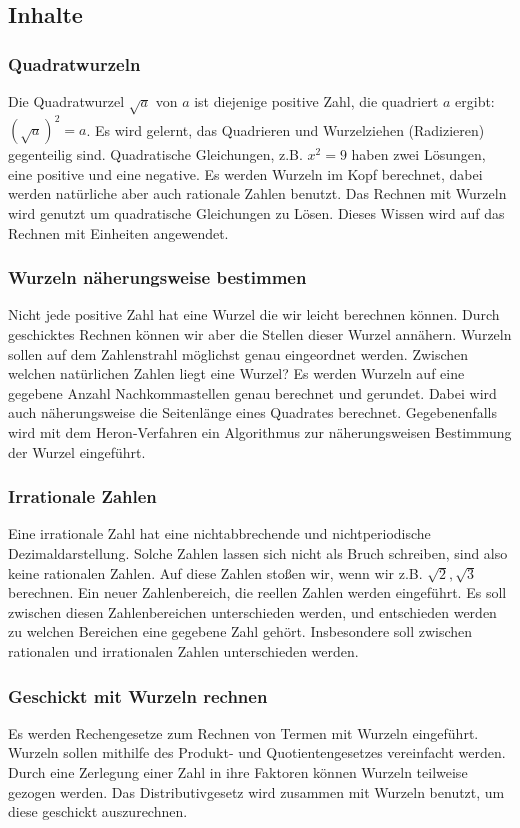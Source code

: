 \documentclass{article}
\begin{document}
\subsection{Inhalte}
\subsubsection*{Quadratwurzeln}
Die Quadratwurzel $\sqrt{a}$ von $a$ ist diejenige positive Zahl, die quadriert $a$ ergibt: $(\sqrt{a})^2 = a$.
Es wird gelernt, das Quadrieren und Wurzelziehen (Radizieren) gegenteilig sind.
Quadratische Gleichungen, z.B. $x^2 = 9$ haben zwei Lösungen, eine positive und eine negative.
Es werden Wurzeln im Kopf berechnet, dabei werden natürliche aber auch rationale Zahlen benutzt.
Das Rechnen mit Wurzeln wird genutzt um quadratische Gleichungen zu Lösen.
Dieses Wissen wird auf das Rechnen mit Einheiten angewendet.
\subsubsection*{Wurzeln näherungsweise bestimmen}
Nicht jede positive Zahl hat eine Wurzel die wir leicht berechnen können. Durch geschicktes Rechnen können wir aber die Stellen dieser Wurzel annähern.
Wurzeln sollen auf dem Zahlenstrahl möglichst genau eingeordnet werden. Zwischen welchen natürlichen Zahlen liegt eine Wurzel?
Es werden Wurzeln auf eine gegebene Anzahl Nachkommastellen genau berechnet und  gerundet.
Dabei wird auch näherungsweise die Seitenlänge eines Quadrates berechnet.
Gegebenenfalls wird mit dem Heron-Verfahren ein Algorithmus zur näherungsweisen Bestimmung der Wurzel eingeführt.
\subsubsection*{Irrationale Zahlen}
Eine irrationale Zahl hat eine nichtabbrechende und nichtperiodische Dezimaldarstellung. Solche Zahlen lassen sich nicht als Bruch schreiben, sind also keine rationalen Zahlen.
Auf diese Zahlen stoßen wir, wenn wir z.B. $\sqrt{2}, \sqrt{3}$ berechnen.
Ein neuer Zahlenbereich, die reellen Zahlen werden eingeführt. Es soll zwischen diesen Zahlenbereichen unterschieden werden, und entschieden werden zu welchen Bereichen eine gegebene Zahl gehört.
Insbesondere soll zwischen rationalen und irrationalen Zahlen unterschieden werden.
\subsubsection*{Geschickt mit Wurzeln rechnen}
Es werden Rechengesetze zum Rechnen von Termen mit Wurzeln eingeführt. 
Wurzeln sollen mithilfe des Produkt- und Quotientengesetzes vereinfacht werden. Durch eine Zerlegung einer Zahl in ihre Faktoren können Wurzeln teilweise gezogen werden.
Das Distributivgesetz wird zusammen mit Wurzeln benutzt, um diese geschickt auszurechnen. 
\newpage
\end{document}
